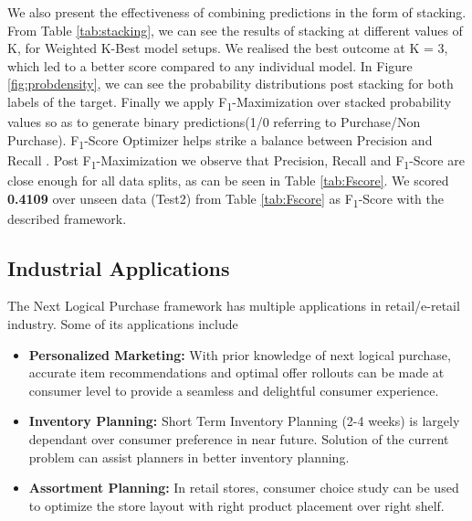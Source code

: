 We also present the effectiveness of combining predictions in the form of stacking. From Table \ref{tab:stacking}, we can see the 
results of stacking at different values of K, for Weighted K-Best model setups. We realised the best outcome at 
K = 3, which led to a better score compared to any individual model.
In Figure \ref{fig:probdensity}, we can see the probability distributions post stacking for both labels of the target.
Finally we apply F\textsubscript{1}-Maximization over stacked probability values so as to generate 
binary predictions(1/0 referring to Purchase/Non Purchase). F\textsubscript{1}-Score Optimizer helps strike a 
balance between Precision and Recall \cite{buckland1994relationship}. Post F\textsubscript{1}-Maximization we 
observe that Precision, Recall and F\textsubscript{1}-Score are close enough for all data splits, as can be seen 
in Table \ref{tab:Fscore}. We scored {\bf 0.4109} over unseen data (Test2)
from Table \ref{tab:Fscore} as F\textsubscript{1}-Score with the described framework.
\subsection{Industrial Applications}
The Next Logical Purchase framework has multiple applications in retail/e-retail industry. Some of its applications 
include
\begin{itemize}
\item {\bf Personalized Marketing:} With prior knowledge of next logical purchase, accurate item recommendations and 
optimal offer rollouts can be made at consumer level to provide a seamless and delightful consumer experience.
\item {\bf Inventory Planning:} Short Term Inventory Planning (2-4 weeks) is largely dependant over 
consumer preference in near future. Solution of the current problem can assist planners in better inventory planning.
\item {\bf Assortment Planning:} In retail stores, consumer choice study can be used to optimize the store 
layout with right product placement over right shelf.
\end{itemize}
